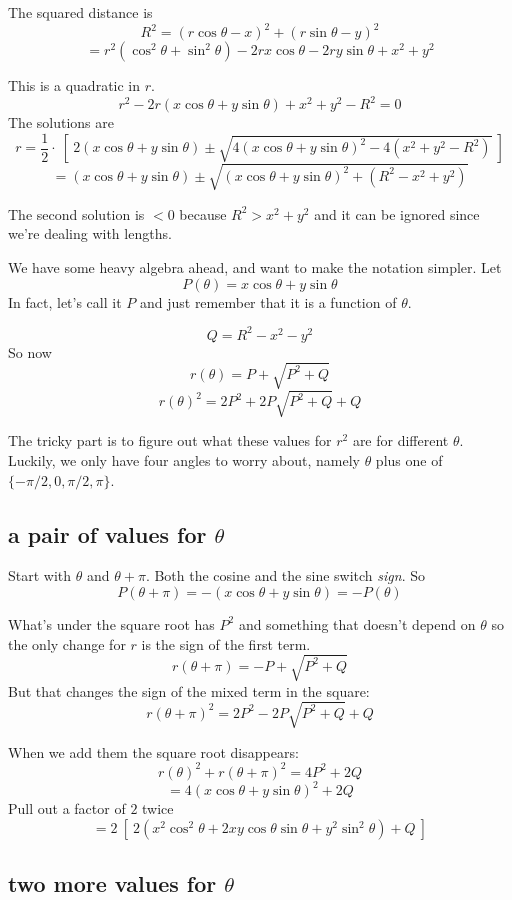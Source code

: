 \documentclass[11pt, oneside]{article}
\begin{document}
The squared distance is
\[ R^2 = (r \cos \theta - x)^2 + (r \sin \theta - y)^2 \]
\[ = r^2 (\cos^2 \theta + \sin^2 \theta) - 2r x \cos \theta - 2 ry \sin \theta + x^2 + y^2 \]

This is a quadratic in $r$.
\[ r^2 - 2r(x \cos \theta + y \sin \theta) + x^2 + y^2 - R^2 = 0 \]
The solutions are
\[ r = \frac{1}{2} \cdot \ [ \ 2(x \cos \theta + y \sin \theta) \pm \sqrt{4(x \cos \theta + y \sin \theta)^2 - 4 (x^2 + y^2 - R^2)} \ ] \]
\[ = (x \cos \theta + y \sin \theta) \pm \sqrt{(x \cos \theta + y \sin \theta)^2 + (R^2 - x^2 + y^2)} \]

The second solution is $< 0$ because $R^2 > x^2 + y^2$ and it can be ignored since we're dealing with lengths.

We have some heavy algebra ahead, and want to make the notation simpler.  Let
\[ P(\theta) = x \cos \theta + y \sin \theta \]
In fact, let's call it $P$ and just remember that it is a function of $\theta$.

\[ Q = R^2 - x^2 - y^2 \]
So now
\[ r(\theta) = P + \sqrt{P^2 + Q} \]
\[ r(\theta)^2 = 2P^2 + 2 P \sqrt{P^2 + Q} + Q \]

The tricky part is to figure out what these values for $r^2$ are for different $\theta$.  Luckily, we only have four angles to worry about, namely $\theta$ plus one of  $\{-\pi/2, 0, \pi/2, \pi\}$.

\subsection*{a pair of values for $\theta$}

Start with $\theta$ and $\theta + \pi$.  Both the cosine and the sine switch \emph{sign}.  So
\[ P(\theta + \pi) = - (x \cos \theta + y \sin \theta) = - P(\theta) \]

What's under the square root has $P^2$ and something that doesn't depend on $\theta$ so the only change for $r$ is the sign of the first term.
\[ r(\theta + \pi) = -P + \sqrt{P^2 + Q} \]
But that changes the sign of the mixed term in the square:
\[  r(\theta + \pi)^2 = 2 P^2 - 2 P \sqrt{P^2 + Q} + Q \]

When we add them the square root disappears:
\[ r(\theta)^2 + r(\theta + \pi)^2 = 4P^2 + 2Q  \] 
\[ = 4 (x \cos \theta + y \sin \theta)^2 + 2Q \]
Pull out a factor of $2$ twice
\[ = 2 \ [ \ 2(x^2 \cos^2 \theta + 2xy \cos \theta \sin \theta + y^2 \sin^2 \theta) + Q \ ] \]

\subsection*{two more values for $\theta$}
\end{document}
